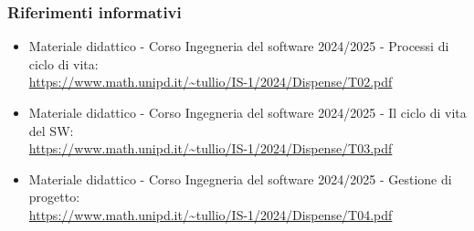         \subsubsection{Riferimenti informativi}
        \begin{itemize}
            \item Materiale didattico - Corso Ingegneria del software 2024/2025 - Processi di ciclo di vita: \\ \url{https://www.math.unipd.it/~tullio/IS-1/2024/Dispense/T02.pdf}
            \item Materiale didattico - Corso Ingegneria del software 2024/2025 - Il ciclo di vita del SW: \\ \url{https://www.math.unipd.it/~tullio/IS-1/2024/Dispense/T03.pdf}
            \item Materiale didattico - Corso Ingegneria del software 2024/2025 - Gestione di progetto: \\ \url{https://www.math.unipd.it/~tullio/IS-1/2024/Dispense/T04.pdf}
        \end{itemize}